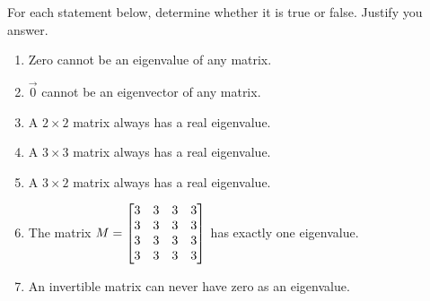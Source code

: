 \begin{exercises}
\begin{problist}
		\prob For each statement below, determine whether it is true or false. Justify you answer.
		\begin{enumerate}
			\item Zero cannot be an eigenvalue of any matrix.
			\item $\vec 0$ cannot be an eigenvector of any matrix.
			\item A $2\times 2$ matrix always has a real eigenvalue.
			\item A $3\times 3$ matrix always has a real eigenvalue.
			\item A $3\times 2$ matrix always has a real eigenvalue.
			\item The matrix $M = \mat{3&3&3&3\\3&3&3&3\\3&3&3&3\\3&3&3&3}$
				has exactly one eigenvalue.
			\item An invertible matrix can never have zero as an eigenvalue.
		\end{enumerate}
	\end{problist}
\end{exercises}
